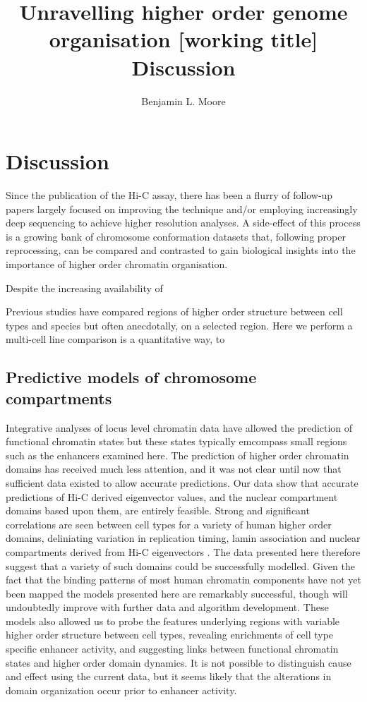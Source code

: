 \documentclass[a4paper,11pt,oneside]{book}
\title{ \vspace{3in} Unravelling higher order genome organisation {\small [working
    title]} \\ \vspace{2em} {\large {\bf Discussion}} }
\author{Benjamin L. Moore}
\begin{document}

\chapter{Discussion}

Since the publication of the Hi-C assay, there has been a flurry of follow-up papers largely focused on improving the technique and/or employing increasingly deep sequencing to achieve higher resolution analyses. A side-effect of this process is a growing bank of chromosome conformation datasets that, following proper reprocessing, can be compared and contrasted to gain biological insights into the importance of higher order chromatin organisation.

Despite the increasing availability of 

Previous studies have compared regions of higher order structure between cell types\cite{Lieberman2009} and species\cite{Dixon2012} but often anecdotally, on a selected region. Here we perform a multi-cell line comparison is a quantitative way, to 


\section{Predictive models of chromosome compartments}

Integrative analyses of locus level chromatin data have allowed the
prediction of functional chromatin states \cite{Ernst2012, Ram2011,
  Dunham2012, Hoffman2013} but these states typically emcompass small
regions such as the enhancers examined here. The prediction of higher
order chromatin domains has received much less attention, and it was
not clear until now that sufficient data existed to allow accurate
predictions. Our data show that accurate predictions of Hi-C derived
eigenvector values, and the nuclear compartment domains based upon
them, are entirely feasible. Strong and significant correlations are
seen between cell types for a variety of human higher order domains,
deliniating variation in replication timing, lamin association and
nuclear compartments derived from Hi-C eigenvectors
\cite{Chambers2013}. The data presented here therefore suggest that a
variety of such domains could be successfully modelled. Given the fact
that the binding patterns of most human chromatin components have not
yet been mapped the models presented here are remarkably successful,
though will undoubtedly improve with further data and algorithm
development. These models also allowed us to probe the features
underlying regions with variable higher order structure between cell
types, revealing enrichments of cell type specific enhancer activity,
and suggesting links between functional chromatin states and higher
order domain dynamics. It is not possible to distinguish cause and
effect using the current data, but it seems likely that the
alterations in domain organization occur prior to enhancer activity.
\end{document}
